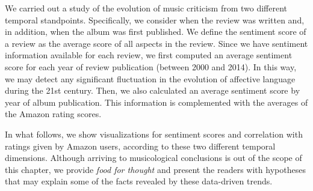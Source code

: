We carried out a study of the evolution of music criticism from two different temporal standpoints. Specifically, we consider when the review was written and, in addition, when the album was first published. We define the sentiment score of a review as the average score of all aspects in the review. Since we have sentiment information available for each review, we first computed an average sentiment score for each year of review publication (between 2000 and 2014). In this way, we may detect any significant fluctuation in the evolution of affective language during the 21st century. Then, we also calculated an average sentiment score by year of album publication. This information is complemented with the averages of the Amazon rating scores.

In what follows, we show visualizations for sentiment scores and correlation with ratings given by Amazon users, according to these two different temporal dimensions. Although arriving to musicological conclusions is out of the scope of this chapter, we provide \textit{food for thought} and present the readers with hypotheses that may explain some of the facts revealed by these data-driven trends.

